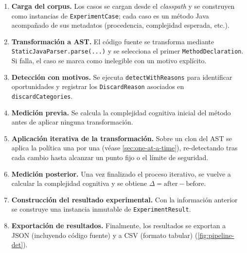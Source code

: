 \begin{enumerate}
    \item \textbf{Carga del corpus.}  
    Los casos se cargan desde el \emph{classpath} y se construyen como instancias de \texttt{ExperimentCase}; cada caso es un método Java acompañado de sus metadatos (procedencia, complejidad esperada, etc.).

    \item \textbf{Transformación a AST.}  
    El código fuente se transforma mediante \lstinline|StaticJavaParser.parse(...)| y se selecciona el primer \lstinline|MethodDeclaration|. Si falla, el caso se marca como inelegible con un motivo explícito.

    \item \textbf{Detección con motivos.}  
    Se ejecuta \lstinline|detectWithReasons| para identificar oportunidades y registrar los \texttt{DiscardReason} asociados en \lstinline|discardCategories|.

    \item \textbf{Medición previa.}  
    Se calcula la complejidad cognitiva inicial del método antes de aplicar ninguna transformación.

    \item \textbf{Aplicación iterativa de la transformación.}  
    Sobre un clon del AST se aplica la política una por una (véase \autoref{sec:one-at-a-time}), re-detectando tras cada cambio hasta alcanzar un punto fijo o el límite de seguridad.

    \item \textbf{Medición posterior.}  
    Una vez finalizado el proceso iterativo, se vuelve a calcular la complejidad cognitiva y se obtiene $\Delta = \text{after} - \text{before}$.

    \item \textbf{Construcción del resultado experimental.}  
    Con la información anterior se construye una instancia inmutable de \texttt{ExperimentResult}.

    \item \textbf{Exportación de resultados.}  
    Finalmente, los resultados se exportan a JSON (incluyendo código fuente) y a CSV (formato tabular) (\autoref{fig:pipeline-det}).
\end{enumerate}

